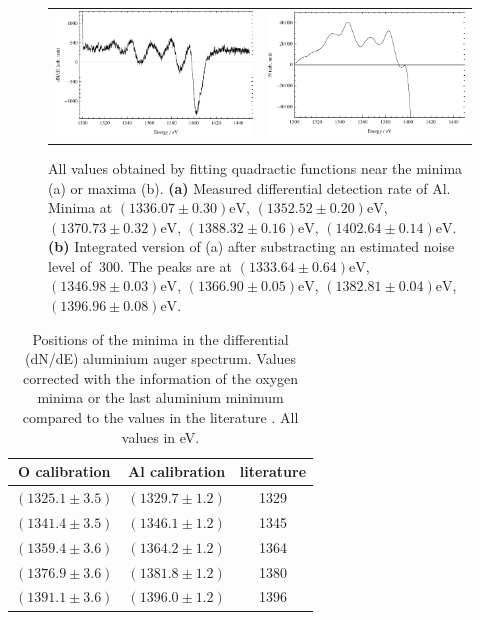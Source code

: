 \documentclass[a4paper]{scrartcl}
\numberwithin{equation}{section}
\numberwithin{figure}{section}
\numberwithin{table}{section}
\begin{document}
\label{sec:kll}
\begin{figure}[!h]
        \begin{center}
		  \begin{tabular}{l r}
        		\includegraphics[width=0.48\linewidth]{pic/auger.pdf}
			&
				\includegraphics[width=0.48\linewidth]{pic/augerSum.pdf}
        \end{tabular}
        \end{center}
        \caption{
			\small All values obtained by fitting quadractic functions near the minima (a) or maxima (b).
			\textbf{(a)} Measured differential detection rate of Al. Minima at $(1336.07\pm 0.30)\text{eV}$, $(1352.52\pm 0.20)\text{eV}$, $(1370.73\pm 0.32)\text{eV}$, $(1388.32\pm 0.16)\text{eV}$, $(1402.64\pm 0.14)\text{eV}$.
			\textbf{(b)} Integrated version of (a) after substracting an estimated noise level of $~300$. The peaks are at $(1333.64\pm 0.64)\text{eV}$, $(1346.98\pm 0.03)\text{eV}$, $(1366.90\pm 0.05)\text{eV}$, $(1382.81\pm 0.04)\text{eV}$, $(1396.96\pm 0.08)\text{eV}$.
        }
        \label{fig:auger}
\end{figure} 
\FloatBarrier
\begin{table}[!h]
\centering
\begin{tabular}{ccc}
\toprule
O calibration & Al calibration & literature \\
\midrule
$(1325.1\pm 3.5)$ & $(1329.7\pm 1.2)$ & 1329 \\
$(1341.4\pm 3.5)$ & $(1346.1\pm 1.2)$ & 1345 \\
$(1359.4\pm 3.6)$ & $(1364.2\pm 1.2)$ & 1364 \\
$(1376.9\pm 3.6)$ & $(1381.8\pm 1.2)$ & 1380 \\
$(1391.1\pm 3.6)$ & $(1396.0\pm 1.2)$ & 1396 \\
 \bottomrule
\end{tabular}
\caption{\small Positions of the minima in the differential (dN/dE) aluminium auger spectrum. Values corrected with the information of the oxygen minima or the last aluminium minimum compared to the values in the literature \cite{handbook}. All values in eV. }
\label{tab:OAlL}
\end{table}
\end{document}
